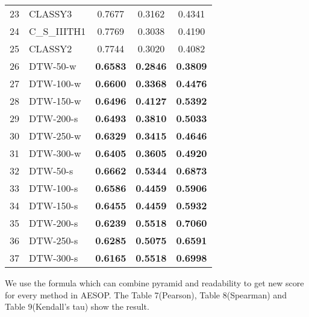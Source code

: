 \begin{table}[h]
\begin{tabular}{rlccc}
    23    & CLASSY3 & 0.7677  & 0.3162  & 0.4341  \\
    24    & C\_S\_IIITH1 & 0.7769  & 0.3038  & 0.4190  \\
    25    & CLASSY2 & 0.7744  & 0.3020  & 0.4082  \\
    26    & DTW-50-w & \textbf{0.6583 } & \textbf{0.2846 } & \textbf{0.3809 } \\
    27    & DTW-100-w & \textbf{0.6600 } & \textbf{0.3368 } & \textbf{0.4476 } \\
    28    & DTW-150-w & \textbf{0.6496 } & \textbf{0.4127 } & \textbf{0.5392 } \\
    29    & DTW-200-s & \textbf{0.6493 } & \textbf{0.3810 } & \textbf{0.5033 } \\
    30    & DTW-250-w & \textbf{0.6329 } & \textbf{0.3415 } & \textbf{0.4646 } \\
    31    & DTW-300-w & \textbf{0.6405 } & \textbf{0.3605 } & \textbf{0.4920 } \\
    32    & DTW-50-s & \textbf{0.6662 } & \textbf{0.5344 } & \textbf{0.6873 } \\
    33    & DTW-100-s & \textbf{0.6586 } & \textbf{0.4459 } & \textbf{0.5906 } \\
    34    & DTW-150-s & \textbf{0.6455 } & \textbf{0.4459 } & \textbf{0.5932 } \\
    35    & DTW-200-s & \textbf{0.6239 } & \textbf{0.5518 } & \textbf{0.7060 } \\
    36    & DTW-250-s & \textbf{0.6285 } & \textbf{0.5075 } & \textbf{0.6591 } \\
    37    & DTW-300-s & \textbf{0.6165 } & \textbf{0.5518 } & \textbf{0.6998 } \\
    \hline
    \end{tabular}%
  \label{tab:addlabel}%
\end{table}%
We use the formula which can combine pyramid and readability to get new score for every method in AESOP. 
The Table 7(Pearson), Table 8(Spearman) and Table 9(Kendall's tau) show the result.

